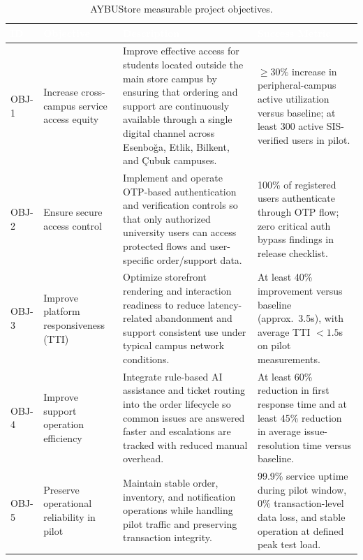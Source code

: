 \documentclass[11pt,a4paper]{article}
\begin{document}
\renewcommand{\arraystretch}{1.25}
\begin{table}[H]
\centering
\small
\begin{tabular}{|p{}|p{}|p{}|p{}|}
\hline
\rowcolor{aybuHeader}
\textcolor{white}{\textbf{ID}} &
\textcolor{white}{\textbf{Objective}} &
\textcolor{white}{\textbf{Description}} &
\textcolor{white}{\textbf{Success Metric}} \\ \hline
 
OBJ-1 & Increase cross-campus service access equity &
Improve effective access for students located outside the main store
campus by ensuring that ordering and support are continuously available
through a single digital channel across Esenboğa, Etlik, Bilkent, and
Çubuk campuses. &
$\geq 30\%$ increase in peripheral-campus active utilization versus
baseline; at least 300 active SIS-verified users in pilot. \\ \hline
 
OBJ-2 & Ensure secure access control &
Implement and operate OTP-based authentication and verification
controls so that only authorized university users can access protected
flows and user-specific order/support data. &
100\% of registered users authenticate through OTP flow; zero critical
auth bypass findings in release checklist. \\ \hline
 
OBJ-3 & Improve platform responsiveness (TTI) &
Optimize storefront rendering and interaction readiness to reduce
latency-related abandonment and support consistent use under typical
campus network conditions. &
At least 40\% improvement versus baseline (approx.\ 3.5s), with average
TTI $< 1.5$s on pilot measurements. \\ \hline
 
OBJ-4 & Improve support operation efficiency &
Integrate rule-based AI assistance and ticket routing into the order
lifecycle so common issues are answered faster and escalations are
tracked with reduced manual overhead. &
At least 60\% reduction in first response time and at least 45\%
reduction in average issue-resolution time versus baseline. \\ \hline
 
OBJ-5 & Preserve operational reliability in pilot &
Maintain stable order, inventory, and notification operations while
handling pilot traffic and preserving transaction integrity. &
99.9\% service uptime during pilot window, 0\% transaction-level data
loss, and stable operation at defined peak test load. \\ \hline
\end{tabular}
\caption{AYBUStore measurable project objectives.}
\label{tab:objectives}
\end{table}
 
\end{document}
